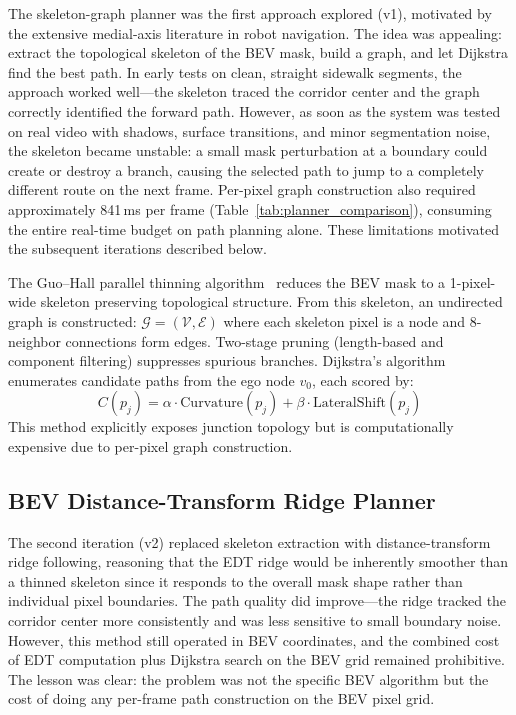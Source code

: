 \documentclass[12pt,letterpaper,oneside]{report}
\begin{document}
The skeleton-graph planner was the first approach explored (v1), motivated by the extensive medial-axis literature in robot navigation. The idea was appealing: extract the topological skeleton of the BEV mask, build a graph, and let Dijkstra find the best path. In early tests on clean, straight sidewalk segments, the approach worked well---the skeleton traced the corridor center and the graph correctly identified the forward path. However, as soon as the system was tested on real video with shadows, surface transitions, and minor segmentation noise, the skeleton became unstable: a small mask perturbation at a boundary could create or destroy a branch, causing the selected path to jump to a completely different route on the next frame. Per-pixel graph construction also required approximately 841\,ms per frame (Table~\ref{tab:planner_comparison}), consuming the entire real-time budget on path planning alone. These limitations motivated the subsequent iterations described below.

The Guo--Hall parallel thinning algorithm~\cite{guo_hall} reduces the BEV mask to a 1-pixel-wide skeleton preserving topological structure. From this skeleton, an undirected graph is constructed: $\mathcal{G} = (\mathcal{V}, \mathcal{E})$ where each skeleton pixel is a node and 8-neighbor connections form edges. Two-stage pruning (length-based and component filtering) suppresses spurious branches. Dijkstra's algorithm~\cite{dijkstra1959note} enumerates candidate paths from the ego node $v_0$, each scored by:
\begin{equation}
C(p_j) = \alpha \cdot \text{Curvature}(p_j) + \beta \cdot \text{LateralShift}(p_j)
\end{equation}
This method explicitly exposes junction topology but is computationally expensive due to per-pixel graph construction.


\subsection{BEV Distance-Transform Ridge Planner}
\label{sec:dt_planner}

The second iteration (v2) replaced skeleton extraction with distance-transform ridge following, reasoning that the EDT ridge would be inherently smoother than a thinned skeleton since it responds to the overall mask shape rather than individual pixel boundaries. The path quality did improve---the ridge tracked the corridor center more consistently and was less sensitive to small boundary noise. However, this method still operated in BEV coordinates, and the combined cost of EDT computation plus Dijkstra search on the BEV grid remained prohibitive. The lesson was clear: the problem was not the specific BEV algorithm but the cost of doing any per-frame path construction on the BEV pixel grid.
\end{document}
